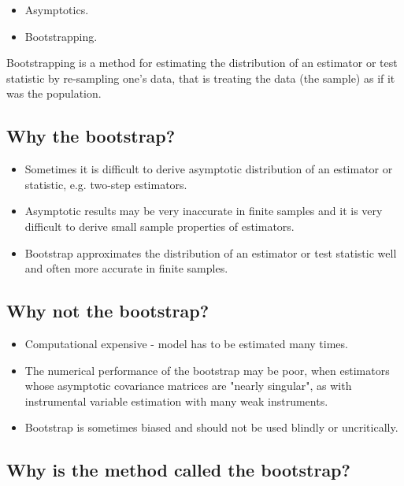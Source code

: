 \documentclass{article}
\begin{document}
\begin{itemize}
\item Asymptotics.

\item Bootstrapping.
\end{itemize}

Bootstrapping is a method for estimating the distribution of an estimator or
test statistic by re-sampling one's data, that is treating the data (the
sample) as if it was the population.

\subsection{Why the bootstrap?}

\begin{itemize}
\item Sometimes it is difficult to derive asymptotic distribution of an
estimator or statistic, e.g. two-step estimators.

\item Asymptotic results may be very inaccurate in finite samples and it is
very difficult to derive small sample properties of estimators.

\item Bootstrap approximates the distribution of an estimator or test
statistic well and often more accurate in finite samples.
\end{itemize}

\subsection{Why not the bootstrap?}

\begin{itemize}
\item Computational expensive - model has to be estimated many times.

\item The numerical performance of the bootstrap may be poor, when
estimators whose asymptotic covariance matrices are "nearly singular", as
with instrumental variable estimation with many weak instruments.

\item Bootstrap is sometimes biased and should not be used blindly or
uncritically.
\end{itemize}

\subsection{Why is the method called the bootstrap?}
\end{document}
